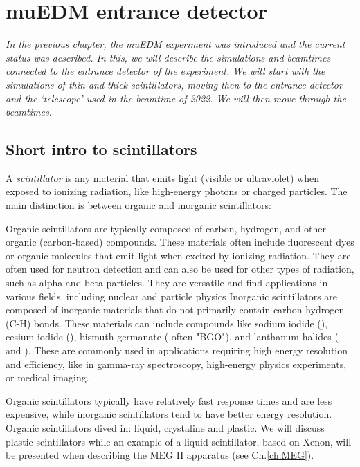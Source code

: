 \chapter{muEDM entrance detector}
\label{ch:muEDM:entrance}
\begin{refsection}

{\itshape
In the previous chapter, the muEDM experiment was introduced and the current status was described.
In this, we will describe the simulations and beamtimes connected to the entrance detector of the experiment. 
We will start with the \gf simulations of thin and thick scintillators, moving then to the entrance detector and the `telescope' used in the beamtime of 2022.
We will then move through the beamtimes.
}

\section{Short intro to scintillators}
\label{sec:muEDM:scintillators}
    A \textit{scintillator} is any material that emits light (visible or ultraviolet) when exposed to ionizing radiation, like high-energy photons or charged particles.
    The main distinction is between organic and inorganic scintillators:
    \begin{outline}
        \1 Organic scintillators are typically composed of carbon, hydrogen, and other organic (carbon-based) compounds. These materials often include fluorescent dyes or organic molecules that emit light when excited by ionizing radiation.
        They are often used for neutron detection and can also be used for other types of radiation, such as alpha and beta particles. They are versatile and find applications in various fields, including nuclear and particle physics
        \1 Inorganic scintillators are composed of inorganic materials that do not primarily contain carbon-hydrogen (C-H) bonds. These materials can include compounds like sodium iodide (), cesium iodide (), bismuth germanate ( often "BGO"), and lanthanum halides ( and ).
        These are commonly used in applications requiring high energy resolution and efficiency, like in gamma-ray spectroscopy, high-energy physics experiments, or medical imaging.
    \end{outline}
    Organic scintillators typically have relatively fast response times and are less expensive, while inorganic scintillators tend to have better energy resolution.
    Organic scintillators dived in: liquid, crystaline and plastic.
    We will discuss plastic scintillators while an example of a liquid scintillator, based on Xenon, will be presented when describing the MEG II apparatus (see Ch.\ref{ch:MEG}).


\end{refsection}
